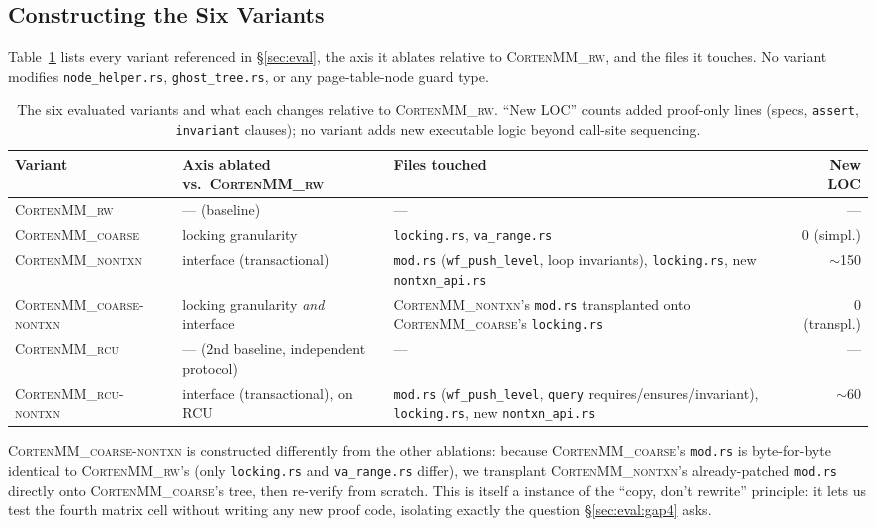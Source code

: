 \documentclass[10pt]{article}
\newcommand{\corten}[1]{\textsc{CortenMM\_#1}}
\newcommand{\vfn}[1]{\texttt{#1}}
\begin{document}
\subsection{Constructing the Six Variants}
\label{sec:method:variants}

Table~\ref{tab:variants} lists every variant referenced in
\S\ref{sec:eval}, the axis it ablates relative to \corten{rw}, and the
files it touches. No variant modifies \vfn{node\_helper.rs},
\vfn{ghost\_tree.rs}, or any page-table-node guard type.

\begin{table}[h]
\centering
\caption{The six evaluated variants and what each changes relative to
\corten{rw}. ``New LOC'' counts added proof-only lines (specs,
\texttt{assert}, \texttt{invariant} clauses); no variant adds new
executable logic beyond call-site sequencing.}
\label{tab:variants}
\small
\begin{tabularx}{\textwidth}{@{}l >{\raggedright\arraybackslash}p{3.1cm} >{\raggedright\arraybackslash}X r@{}}
\toprule
Variant & Axis ablated vs.\ \corten{rw} & Files touched & New LOC \\
\midrule
\corten{rw} & --- (baseline) & --- & --- \\
\corten{coarse} & locking granularity & \vfn{locking.rs}, \vfn{va\_range.rs} & 0 (simpl.) \\
\corten{nontxn} & interface (transactional) & \vfn{mod.rs} (\vfn{wf\_push\_level},
  loop invariants), \vfn{locking.rs}, new \vfn{nontxn\_api.rs} & $\sim$150 \\
\corten{coarse-nontxn} & locking granularity \emph{and} interface & \corten{nontxn}'s \vfn{mod.rs}
  transplanted onto \corten{coarse}'s \vfn{locking.rs} & 0 (transpl.) \\
\corten{rcu} & --- (2nd baseline, independent protocol) & --- & --- \\
\corten{rcu-nontxn} & interface (transactional), on RCU & \vfn{mod.rs} (\vfn{wf\_push\_level}, \vfn{query}
  requires/ensures/invariant), \vfn{locking.rs}, new \vfn{nontxn\_api.rs} & $\sim$60 \\
\bottomrule
\end{tabularx}
\end{table}

\corten{coarse-nontxn} is constructed differently from the other
ablations: because \corten{coarse}'s \vfn{mod.rs} is byte-for-byte
identical to \corten{rw}'s (only \vfn{locking.rs} and
\vfn{va\_range.rs} differ), we transplant \corten{nontxn}'s
already-patched \vfn{mod.rs} directly onto \corten{coarse}'s tree, then
re-verify from scratch. This is itself a instance of the ``copy, don't rewrite''
principle: it lets us test the fourth matrix cell without writing any
new proof code, isolating exactly the question \S\ref{sec:eval:gap4}
asks.
\end{document}
